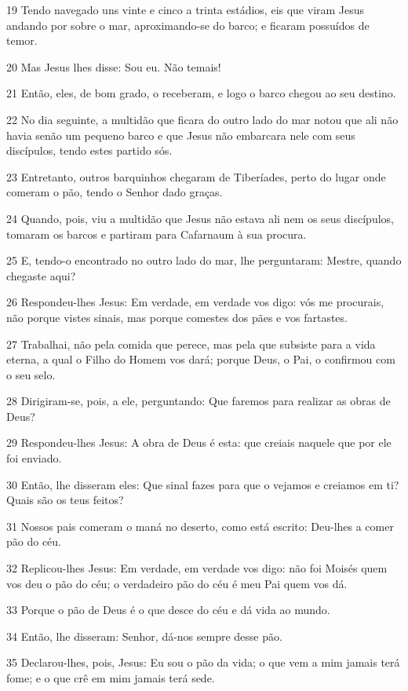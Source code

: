 \par 19 Tendo navegado uns vinte e cinco a trinta estádios, eis que viram Jesus andando por sobre o mar, aproximando-se do barco; e ficaram possuídos de temor.
\par 20 Mas Jesus lhes disse: Sou eu. Não temais!
\par 21 Então, eles, de bom grado, o receberam, e logo o barco chegou ao seu destino.
\par 22 No dia seguinte, a multidão que ficara do outro lado do mar notou que ali não havia senão um pequeno barco e que Jesus não embarcara nele com seus discípulos, tendo estes partido sós.
\par 23 Entretanto, outros barquinhos chegaram de Tiberíades, perto do lugar onde comeram o pão, tendo o Senhor dado graças.
\par 24 Quando, pois, viu a multidão que Jesus não estava ali nem os seus discípulos, tomaram os barcos e partiram para Cafarnaum à sua procura.
\par 25 E, tendo-o encontrado no outro lado do mar, lhe perguntaram: Mestre, quando chegaste aqui?
\par 26 Respondeu-lhes Jesus: Em verdade, em verdade vos digo: vós me procurais, não porque vistes sinais, mas porque comestes dos pães e vos fartastes.
\par 27 Trabalhai, não pela comida que perece, mas pela que subsiste para a vida eterna, a qual o Filho do Homem vos dará; porque Deus, o Pai, o confirmou com o seu selo.
\par 28 Dirigiram-se, pois, a ele, perguntando: Que faremos para realizar as obras de Deus?
\par 29 Respondeu-lhes Jesus: A obra de Deus é esta: que creiais naquele que por ele foi enviado.
\par 30 Então, lhe disseram eles: Que sinal fazes para que o vejamos e creiamos em ti? Quais são os teus feitos?
\par 31 Nossos pais comeram o maná no deserto, como está escrito: Deu-lhes a comer pão do céu.
\par 32 Replicou-lhes Jesus: Em verdade, em verdade vos digo: não foi Moisés quem vos deu o pão do céu; o verdadeiro pão do céu é meu Pai quem vos dá.
\par 33 Porque o pão de Deus é o que desce do céu e dá vida ao mundo.
\par 34 Então, lhe disseram: Senhor, dá-nos sempre desse pão.
\par 35 Declarou-lhes, pois, Jesus: Eu sou o pão da vida; o que vem a mim jamais terá fome; e o que crê em mim jamais terá sede.
